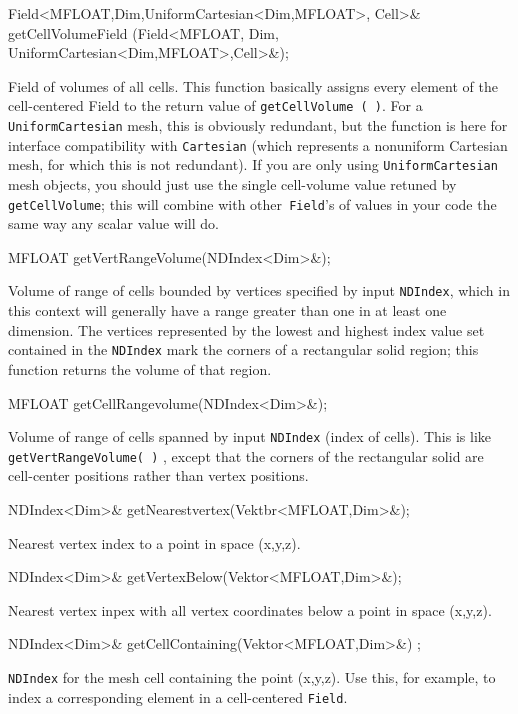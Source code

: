 \begin{smallcode}
Field<MFLOAT,Dim,UniformCartesian<Dim,MFLOAT>, Cell>& 
getCellVolumeField (Field<MFLOAT, Dim, UniformCartesian<Dim,MFLOAT>,Cell>&);
\end{smallcode}
Field of volumes of all cells. This function basically assigns every element of the cell-centered Field to the return value of \texttt{getCellVolume ( )}. For a \texttt{UniformCartesian} mesh, this is obviously redundant,
but the function is here for interface compatibility with \texttt{Cartesian} (which represents a nonuniform Cartesian mesh, for which this is not redundant). 
If you are only using \texttt{UniformCartesian} mesh objects, you should just use the single cell-volume value retuned by \texttt{getCellVolume}; this will combine with other\texttt{ Field}'s of 
values in your code the same way any scalar value will do. 
\begin{smallcode}
MFLOAT getVertRangeVolume(NDIndex<Dim>&);
\end{smallcode} 
Volume of range of cells bounded by vertices specified by input \texttt{NDIndex}, which in this context will generally have a range greater than one in at least one dimension. The vertices represented by the lowest and 
highest index value set contained in the \texttt{NDIndex} mark the corners of a rectangular solid region; this function returns the volume of that region. 
\begin{smallcode}
MFLOAT getCellRangevolume(NDIndex<Dim>&);
\end{smallcode}
Volume of range of cells spanned by input \texttt{NDIndex} (index of cells). This is like \texttt{getVertRangeVolume( )} , except that the corners of the rectangular solid are 
cell-center positions rather than vertex positions. 

\begin{smallcode}
NDIndex<Dim>& getNearestvertex(Vektbr<MFLOAT,Dim>&);
\end{smallcode}
Nearest vertex index to a point in space (x,y,z). 

\begin{smallcode}
NDIndex<Dim>& getVertexBelow(Vektor<MFLOAT,Dim>&);
\end{smallcode} 
Nearest vertex inpex with all vertex coordinates below a point in space (x,y,z). 

\begin{smallcode}
NDIndex<Dim>& getCellContaining(Vektor<MFLOAT,Dim>&) ;
\end{smallcode}
\texttt{NDIndex} for the mesh cell containing the point (x,y,z). Use this, for example, to index a corresponding element in a cell-centered \texttt{Field}. 

